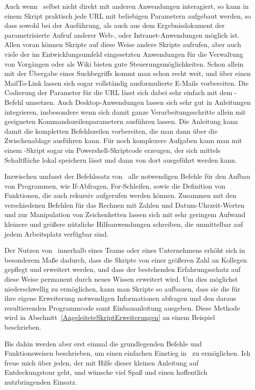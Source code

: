 Auch wenn \FPZ\ selbst nicht direkt mit anderen Anwendungen interagiert, so kann in einem Skript praktisch jede URL mit beliebigen Parametern aufgebaut werden, so dass sowohl bei der Ausführung, als auch aus dem Ergebnisdokument der parametrisierte Aufruf anderer Web-, oder Intranet-Anwendungen möglich ist. Allen voran können Skripte auf diese Weise andere Skripte aufrufen, aber auch viele der im Entwicklungsumfeld eingesetzten Anwendungen für die Verwaltung von Vorgängen oder als Wiki bieten gute Steuerungsmöglichkeiten. Schon allein mit der Übergabe eines Suchbegriffs kommt man schon recht weit, und über einen MailTo-Link lassen sich sogar vollständig ausformulierte E-Mails vorbereiten. Die Codierung der Parameter für die URL lässt sich dabei sehr einfach mit dem -Befehl umsetzen. Auch Desktop-Anwendungen lassen sich sehr gut in Anleitungen integrieren, insbesondere wenn sich damit ganze Verarbeitungsschritte allein mit geeigneten Kommandozeilenparametern ausführen lassen. Die Anleitung kann damit die kompletten Befehlszeilen vorbereiten, die man dann über die Zwischenablage ausführen kann. Für noch komplexere Aufgaben kann man mit einem \FPZb-Skript sogar ein Powershell-Skriptcode erzeugen, der sich mittels Schaltfläche lokal speichern lässt und dann von dort ausgeführt werden kann. 

Inzwischen umfasst der Befehlssatz von \FPZ\ alle notwendigen Befehle für den Aufbau von Programmen, wie If-Abfragen, For-Schleifen, sowie die Definition von Funktionen, die auch rekursiv aufgerufen werden können. Zusammen mit den verschiedenen Befehlen für das Rechnen mit Zahlen und Datum-Uhrzeit-Werten und zur Manipulation von Zeichenketten lassen sich mit sehr geringem Aufwand kleinere und größere nützliche Hilfsanwendungen schreiben, die unmittelbar auf jedem Arbeitsplatz verfügbar sind.

Der Nutzen von \FPZ\ innerhalb eines Teams oder eines Unternehmens erhöht sich in besonderem Maße dadurch, dass die Skripte von einer größeren Zahl an Kollegen gepflegt und erweitert werden, und dass der bestehenden Erfahrungsschatz auf diese Weise permanent durch neues Wissen erweitert wird. Um dies möglichst niederschwellig zu ermöglichen, kann man Skripte so aufbauen, dass sie die für ihre eigene Erweiterung notwendigen Informationen abfragen und den daraus resultierenden Programmcode samt Einbauanleitung ausgeben. Diese Methode wird in Abschnitt~\ref{AngeleiteteSkriptErweiterungen} an einem Beispiel beschrieben.

Bis dahin werden aber erst einmal die grundlegenden Befehle und Funktionsweisen beschrieben, um einen einfachen Einstieg in \FPZ\ zu ermöglichen. Ich freue mich über jeden, der mit Hilfe dieser kleinen Anleitung auf Entdeckungstour geht, und wünsche viel Spaß und einen hoffentlich nutzbringenden Einsatz.

